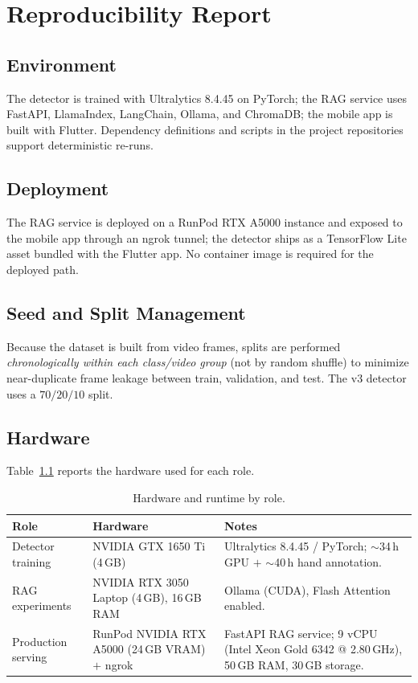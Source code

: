 \chapter{Reproducibility Report}

\section{Environment}
The detector is trained with Ultralytics 8.4.45 on PyTorch; the RAG service uses
FastAPI, LlamaIndex, LangChain, Ollama, and ChromaDB; the mobile app is built with
Flutter. Dependency definitions and scripts in the project repositories support
deterministic re-runs.

\section{Deployment}
The RAG service is deployed on a RunPod RTX A5000 instance and exposed to the mobile
app through an
ngrok tunnel; the detector ships as a TensorFlow Lite asset bundled with the Flutter
app. No container image is required for the deployed path.

\section{Seed and Split Management}
Because the dataset is built from video frames, splits are performed
\emph{chronologically within each class/video group} (not by random shuffle) to
minimize near-duplicate frame leakage between train, validation, and test. The v3
detector uses a $70/20/10$ split.

\section{Hardware}
Table~\ref{tab:hardware} reports the hardware used for each role.

\begin{table}[htbp]
\centering
\caption{Hardware and runtime by role.}
\label{tab:hardware}
\begin{tabularx}{\textwidth}{@{}l>{\raggedright\arraybackslash}p{}>{\raggedright\arraybackslash}X@{}}
\toprule
\textbf{Role} & \textbf{Hardware} & \textbf{Notes}\\
\midrule
Detector training & NVIDIA GTX 1650 Ti (4\,GB) & Ultralytics 8.4.45 / PyTorch; $\sim$34\,h GPU $+$ $\sim$40\,h hand annotation.\\
RAG experiments   & NVIDIA RTX 3050 Laptop (4\,GB), 16\,GB RAM & Ollama (CUDA), Flash Attention enabled.\\
Production serving & RunPod NVIDIA RTX A5000 (24\,GB VRAM) $+$ ngrok & FastAPI RAG
service; 9 vCPU (Intel Xeon Gold 6342 @ 2.80\,GHz), 50\,GB RAM, 30\,GB storage.\\
\bottomrule
\end{tabularx}
\end{table}

